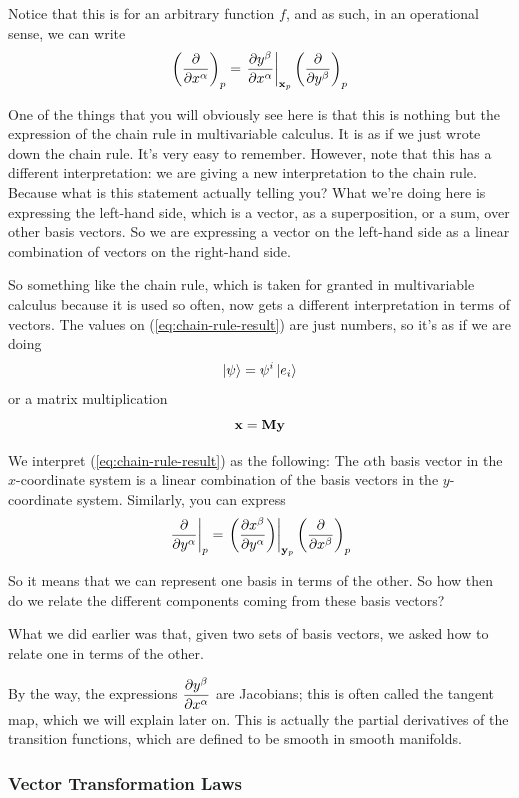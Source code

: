 		Notice that this is for an arbitrary function $f$, and as such, in an operational sense, we can write
		\begin{equation}
			\pqty{ \pdv{}{x^\alpha}}_p 
			=
			\eval{\pdv{y^\beta}{x^\alpha}}_{\vb{x}_p} 
			\pqty{{\pdv{}{y^\beta}}}_p
			\label{eq:chain-rule-result}
		\end{equation}

		One of the things that you will obviously see here is that this is nothing but the expression
		of the chain rule in multivariable calculus. It is as if we just wrote down the chain rule. It's very
		easy to remember. However, note that this has a different interpretation: we are giving a new interpretation
		to the chain rule. Because what is this statement actually telling you?
		What we're doing here is expressing the left-hand side, which is a vector, as a superposition, or a sum, over other
		basis vectors. So we are expressing a vector on the left-hand side as a linear combination of vectors on the right-hand side.

		So something like the chain rule, which is taken for granted in multivariable calculus because it is used so
		often, now gets a different interpretation in terms of vectors. The values on (\ref{eq:chain-rule-result}) are
		just numbers, so it's as if we are doing
		\[
			\ket{\psi} = \psi^i \ket{e_i}
		\]
		or a matrix multiplication
		\[
			\vb{x} = \vb{M}\vb{y}
		\]

		We interpret (\ref{eq:chain-rule-result}) as the following: The $\alpha$th basis vector in the $x$-coordinate system
		is a linear combination of the basis vectors in the $y$-coordinate system. Similarly, you can express
		\[
			\eval{\pdv{}{y^\alpha}}_p =  
			\eval{\pqty{
				\pdv{x^\beta}{y^\alpha} 
			}}_{\vb{y}_p} 
			\pqty{{\pdv{}{x^\beta}}}_p
		\]

		So it means that we can represent one basis in terms of the other. So how then do
		we relate the different components coming from these basis vectors?

		What we did earlier was that, given two sets of basis vectors, we asked how to relate one in terms
		of the other.

		By the way, the expressions $\displaystyle\pdv{y^\beta}{x^\alpha}$ are Jacobians; this is often called the tangent map,
		which we will explain later on. This is actually the partial derivatives of the transition functions, which are defined
		to be smooth in smooth manifolds.

	\subsubsection{Vector Transformation Laws}

